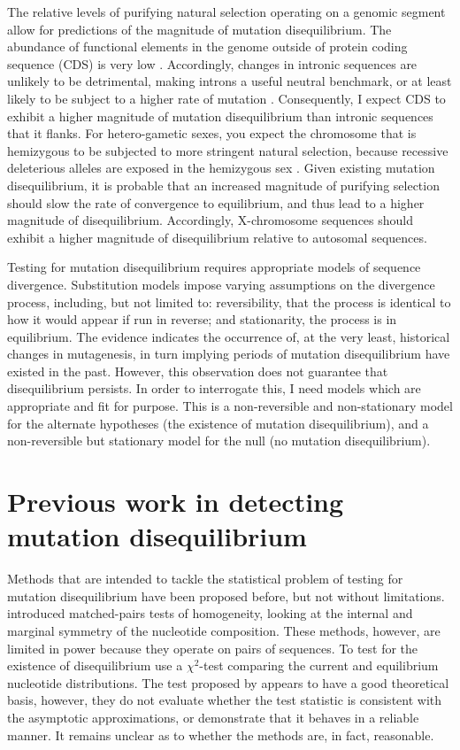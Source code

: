 The relative levels of purifying natural selection operating on a genomic segment allow for predictions of the magnitude of mutation disequilibrium. The abundance of functional elements in the genome outside of protein coding sequence (CDS) is very low \citep{Graur2013OnENCODE}. Accordingly, changes in intronic sequences are unlikely to be detrimental, making introns a useful neutral benchmark, or at least likely to be subject to a higher rate of mutation \citep{Graur2013OnENCODE}. Consequently, I expect CDS to exhibit a higher magnitude of mutation disequilibrium than intronic sequences that it flanks. For hetero-gametic sexes, you expect the chromosome that is hemizygous to be subjected to more stringent natural selection, because recessive deleterious alleles are exposed in the hemizygous sex \citep{Charlesworth1987TheAutosomes}. Given existing mutation disequilibrium, it is probable that an increased magnitude of purifying selection should slow the rate of convergence to equilibrium, and thus lead to a higher magnitude of disequilibrium. Accordingly, X-chromosome sequences should exhibit a higher magnitude of disequilibrium relative to autosomal sequences. 

Testing for mutation disequilibrium requires appropriate \gls{models} of sequence divergence. \Gls{Substitution models} impose varying assumptions on the divergence process, including, but not limited to: reversibility, that the process is identical to how it would appear if run in reverse; and \gls{stationarity}, the process is in \gls{equilibrium}. The evidence indicates the occurrence of, at the very least, historical changes in mutagenesis, in turn implying periods of mutation disequilibrium have existed in the past. However, this observation does not guarantee that disequilibrium persists. In order to interrogate this, I need models which are appropriate and fit for purpose. This is a non-reversible and non-stationary model for the alternate hypotheses (the existence of mutation disequilibrium), and a non-reversible but stationary model for the null (no mutation disequilibrium). 

\section{Previous work in detecting mutation disequilibrium}

Methods that are intended to tackle the statistical problem of testing for mutation disequilibrium have been proposed before, but not without limitations. \cite{Ababneh2006Matched-pairsSequences} introduced matched-pairs tests of homogeneity, looking at the internal and marginal symmetry of the nucleotide composition. These methods, however, are limited in power because they operate on pairs of sequences. To test for the existence of disequilibrium \cite{Squartini2008QuantifyingProcess} use a $\chi^2$-test comparing the current and equilibrium nucleotide distributions. The test proposed by \cite{Squartini2008QuantifyingProcess} appears to have a good theoretical basis, however, they do not evaluate whether the test statistic is consistent with the asymptotic approximations, or demonstrate that it behaves in a reliable manner. It remains unclear as to whether the methods are, in fact, reasonable. 

